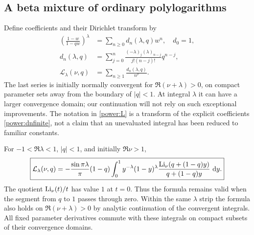 \subsection{A beta mixture of ordinary polylogarithms}

Define coefficients and their Dirichlet transform by
\begin{align}
 \left(\frac{1-w}{1-qw}\right)^\lambda
   &=\sum_{n\ge0}d_n(\lambda,q)w^n,\quad d_0=1,
       \label{power:dn}\\
 d_n(\lambda,q)&=\sum_{j=0}^n
       \frac{(-\lambda)_j(\lambda)_{n-j}}{j!(n-j)!}q^{n-j},
       \label{power:dnfinite}\\
 \mathcal L_\lambda(\nu,q)&=\sum_{n\ge1}
                               \frac{d_n(\lambda,q)}{n^\nu}.
       \label{power:L}
\end{align}
The last series is initially normally convergent for
$\Re(\nu+\lambda)>0$, on compact parameter sets away from the boundary
of $|q|<1$.  At integral $\lambda$ it can have a larger convergence
domain; our continuation will not rely on such exceptional improvements.
The notation in \eqref{power:L} is a transform of the explicit
coefficients \eqref{power:dnfinite}, not a claim that an unevaluated
integral has been reduced to familiar constants.

\begin{theorem}\label{power:eulerthm}
For $-1<\Re\lambda<1$, $|q|<1$, and initially $\Re\nu>1$,
\begin{equation}\label{power:euler}
 \boxed{\displaystyle
 \mathcal L_\lambda(\nu,q)=
 -\frac{\sin\pi\lambda}{\pi}(1-q)
 \int_0^1 y^{-\lambda}(1-y)^\lambda
       \frac{\operatorname{Li}_\nu(q+(1-q)y)}{q+(1-q)y}\,\mathop{}\!\mathrm{d} y.}
\end{equation}
The quotient $\operatorname{Li}_\nu(t)/t$ has value $1$ at $t=0$.  Thus the
formula remains valid when the segment from $q$ to $1$ passes through
zero.  Within the same $\lambda$ strip the formula also holds on
$\Re(\nu+\lambda)>0$ by analytic continuation of the convergent
integrals.  All fixed parameter derivatives commute with these integrals
on compact subsets of their convergence domains.
\end{theorem}


